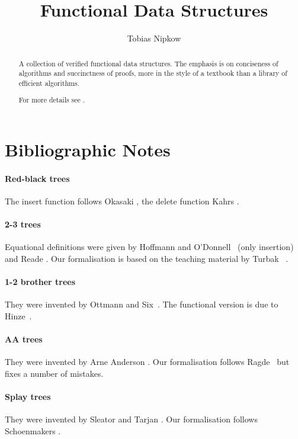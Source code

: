 \documentclass[11pt,a4paper]{article}
\begin{document}
\title{Functional Data Structures}
\author{Tobias Nipkow}
\maketitle

\begin{abstract}
A collection of verified functional data structures. The emphasis is on
conciseness of algorithms and succinctness of proofs, more in the style
of a textbook than a library of efficient algorithms.

For more details see \cite{Nipkow16}.
\end{abstract}

\setcounter{tocdepth}{1}
\tableofcontents
\newpage



\section{Bibliographic Notes}

\paragraph{Red-black trees}
The insert function follows Okasaki \cite{Okasaki}, the delete function
Kahrs \cite{Kahrs-html,Kahrs-JFP01}.

\paragraph{2-3 trees}
Equational definitions were given by Hoffmann and
O'Donnell~\cite{HoffmannOD-TOPLAS82} (only insertion)
and Reade \cite{Reade-SCP92}.
Our formalisation is based on the teaching material by
Turbak~\cite{Turbak230} .

\paragraph{1-2 brother trees}
They were invented by Ottmann and Six~\cite{OttmannS76,OttmannW-CJ80}.
The functional version is due to Hinze~\cite{Hinze-bro12}.

\paragraph{AA trees}
They were invented by Arne Anderson \cite{Andersson-WADS93}.
Our formalisation follows Ragde~\cite{Ragde14} but fixes a number
of mistakes.

\paragraph{Splay trees}
They were invented by Sleator and Tarjan \cite{SleatorT-JACM85}.
Our formalisation follows Schoenmakers \cite{Schoenmakers-IPL93}.
\end{document}
